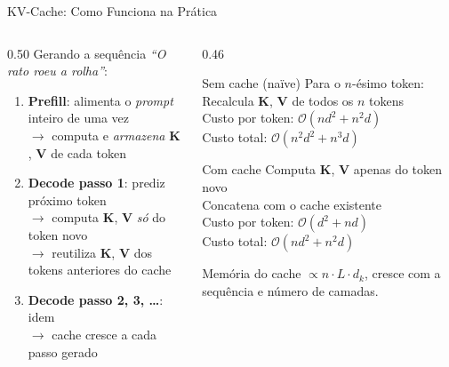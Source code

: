 \documentclass[aspectratio=169, xcolor=dvipsnames]{beamer}
\begin{document}
  \begin{frame}{KV-Cache: Como Funciona na Prática}
    \begin{columns}[T]
      \begin{column}{0.50\textwidth}
        Gerando a sequência \textit{``O rato roeu a rolha''}:
        \vspace{0.3em}
        \begin{enumerate}
          \item \textbf{Prefill}: alimenta o \textit{prompt} inteiro de uma vez\\
                $\to$ computa e \textit{armazena} $\mathbf{K}$, $\mathbf{V}$ de cada token
          \item \textbf{Decode passo 1}: prediz próximo token\\
                $\to$ computa $\mathbf{K}$, $\mathbf{V}$ \textit{só} do token novo\\
                $\to$ reutiliza $\mathbf{K}$, $\mathbf{V}$ dos tokens anteriores do cache
          \item \textbf{Decode passo 2, 3, \ldots}: idem\\
                $\to$ cache cresce a cada passo gerado
        \end{enumerate}
      \end{column}
      \begin{column}{0.46\textwidth}
        \begin{block}{Sem cache (naïve)}
          Para o $n$-ésimo token:\\
          Recalcula $\mathbf{K}$, $\mathbf{V}$ de todos os $n$ tokens\\
          Custo por token: $\mathcal{O}(n d^2 + n^2 d)$\\
          Custo total: $\mathcal{O}(n^2 d^2 + n^3 d)$
        \end{block}
        \vspace{0.3em}
        \begin{block}{Com cache}
          Computa $\mathbf{K}$, $\mathbf{V}$ apenas do token novo\\
          Concatena com o cache existente\\
          Custo por token: $\mathcal{O}(d^2 + n d)$\\
          Custo total: $\mathcal{O}(n d^2 + n^2 d)$
        \end{block}
        \vspace{0.2em}
        {\footnotesize Memória do cache $\propto n \cdot L \cdot d_k$, cresce com a sequência e número de camadas.}
      \end{column}
    \end{columns}
  \end{frame}
\end{document}
